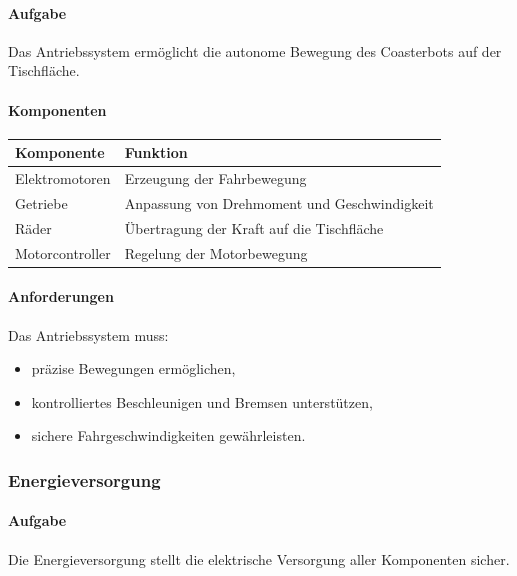 \documentclass[
  a4paper,
  12pt,
  DIV=12,        %
  parskip=half,  %
  headings=small %
]{scrartcl}
\theoremstyle{definition}
\providecommand{\tightlist}{%
  \setlength{\itemsep}{0pt}\setlength{\parskip}{0pt}}
\theoremstyle{definition}
\begin{document}
\paragraph{Aufgabe}\label{aufgabe-1}

Das Antriebssystem ermöglicht die autonome Bewegung des Coasterbots auf
der Tischfläche.

\paragraph{Komponenten}\label{komponenten}

\begin{longtable}[]{@{}ll@{}}
\toprule\noalign{}
Komponente & Funktion \\
\midrule\noalign{}
\endhead
\bottomrule\noalign{}
\endlastfoot
Elektromotoren & Erzeugung der Fahrbewegung \\
Getriebe & Anpassung von Drehmoment und Geschwindigkeit \\
Räder & Übertragung der Kraft auf die Tischfläche \\
Motorcontroller & Regelung der Motorbewegung \\
\end{longtable}

\paragraph{Anforderungen}\label{anforderungen-1}

Das Antriebssystem muss:

\begin{itemize}
\tightlist
\item
  präzise Bewegungen ermöglichen,
\item
  kontrolliertes Beschleunigen und Bremsen unterstützen,
\item
  sichere Fahrgeschwindigkeiten gewährleisten.
\end{itemize}

\subsubsection{Energieversorgung}\label{energieversorgung-1}

\paragraph{Aufgabe}\label{aufgabe-2}

Die Energieversorgung stellt die elektrische Versorgung aller
Komponenten sicher.
\end{document}
